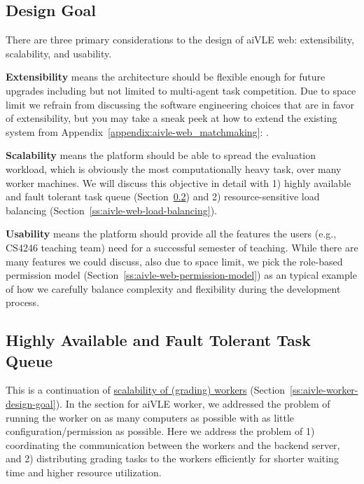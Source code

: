 \subsection{Design Goal}
There are three primary considerations to the design of aiVLE web: extensibility, scalability, and usability. 

\textbf{Extensibility} means the architecture should be flexible enough for future upgrades including but not limited to multi-agent task competition. Due to space limit we refrain from discussing the software engineering choices that are in favor of extensibility, but you may take a sneak peek at how to extend the existing system from Appendix~\ref{appendix:aivle-web_matchmaking}: .

\textbf{Scalability} means the platform should be able to spread the evaluation workload, which is obviously the most computationally heavy task, over many worker machines. We will discuss this objective in detail with 1) highly available and fault tolerant task queue (Section~\ref{ch:aivle-web_highly-available-task-queue}) and 2) resource-sensitive load balancing (Section~\ref{ss:aivle-web-load-balancing}).

\textbf{Usability} means the platform should provide all the features the users (e.g., CS4246 teaching team) need for a successful semester of teaching. While there are many features we could discuss, also due to space limit, we pick the role-based permission model (Section~\ref{ss:aivle-web-permission-model}) as an typical example of how we carefully balance complexity and flexibility during the development process.

\subsection{Highly Available and Fault Tolerant Task Queue}
\label{ch:aivle-web_highly-available-task-queue}
This is a continuation of \hyperref[ss:aivle-worker-design-goal]{scalability of (grading) workers} (Section~\ref{ss:aivle-worker-design-goal}). In the section for aiVLE worker, we addressed the problem of running the worker on as many computers as possible with as little configuration/permission as possible. Here we address the problem of 1) coordinating the communication between the workers and the backend server, and 2) distributing grading tasks to the workers efficiently for shorter waiting time and higher resource utilization.
